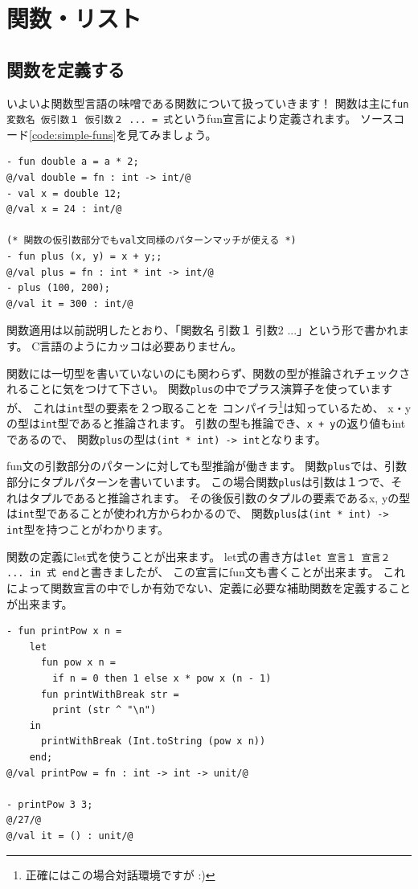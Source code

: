 \documentclass[11pt,a4paper]{article}
\begin{document}
\section{関数・リスト}
\subsection{関数を定義する}
いよいよ関数型言語の味噌である関数について扱っていきます！
関数は主に\lstinline{fun 変数名 仮引数１ 仮引数２ ... = 式}というfun宣言により定義されます。
ソースコード\ref{code:simple-funs}を見てみましょう。

\begin{lstlisting}[caption={単純な関数の定義},label={code:simple-funs}]
- fun double a = a * 2;
@/val double = fn : int -> int/@
- val x = double 12;
@/val x = 24 : int/@

(* 関数の仮引数部分でもval文同様のパターンマッチが使える *)
- fun plus (x, y) = x + y;;
@/val plus = fn : int * int -> int/@
- plus (100, 200);
@/val it = 300 : int/@
\end{lstlisting}

関数適用は以前説明したとおり、「関数名 引数１ 引数2 ...」という形で書かれます。
C言語のようにカッコは必要ありません。

関数には一切型を書いていないのにも関わらず、関数の型が推論されチェックされることに気をつけて下さい。
関数\lstinline{plus}の中でプラス演算子を使っていますが、
これは\lstinline{int}型の要素を２つ取ることを
コンパイラ\footnote{正確にはこの場合対話環境ですが :)}は知っているため、
x・yの型は\lstinline{int}型であると推論されます。
引数の型も推論でき、\lstinline{x + y}の返り値もintであるので、
関数\lstinline{plus}の型は\lstinline{(int * int) -> int}となります。

fun文の引数部分のパターンに対しても型推論が働きます。
関数\lstinline{plus}では、引数部分にタプルパターンを書いています。
この場合関数\lstinline{plus}は引数は１つで、それはタプルであると推論されます。
その後仮引数のタプルの要素であるx, yの型は\lstinline{int}型であることが使われ方からわかるので、
関数\lstinline{plus}は\lstinline{(int * int) -> int}型を持つことがわかります。

関数の定義にlet式を使うことが出来ます。
let式の書き方は\lstinline{let 宣言１ 宣言２ ... in 式 end}と書きましたが、
この宣言にfun文も書くことが出来ます。
これによって関数宣言の中でしか有効でない、定義に必要な補助関数を定義することが出来ます。

\begin{lstlisting}[caption=ネストした関数宣言,label=code:nested-fun]
- fun printPow x n =
    let
      fun pow x n =
        if n = 0 then 1 else x * pow x (n - 1)
      fun printWithBreak str =
        print (str ^ "\n")
    in
      printWithBreak (Int.toString (pow x n))
    end;
@/val printPow = fn : int -> int -> unit/@

- printPow 3 3;
@/27/@
@/val it = () : unit/@
\end{lstlisting}
\end{document}

